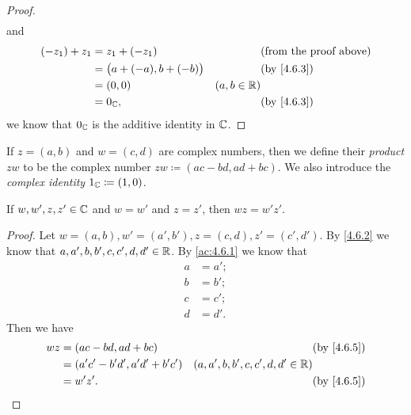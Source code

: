 \begin{proof}
\begin{align*}
  \end{align*}
  and
  \begin{align*}
    (-z_1) + z_1 & = z_1 + (-z_1)                 &               & \text{(from the proof above)} \\
                 & = \big(a + (-a), b + (-b)\big) &               & \text{(by \cref{4.6.3})}      \\
                 & = (0, 0)                       & (a, b \in \R)                                 \\
                 & = 0_{\C},                      &               & \text{(by \cref{4.6.3})}
  \end{align*}
  we know that \(0_{\mathbb{C}}\) is the additive identity in \(\mathbb{C}\).
\end{proof}

\begin{defn}\label{4.6.5}
  If \(z = (a, b)\) and \(w = (c, d)\) are complex numbers, then we define their \emph{product} \(zw\) to be the complex number \(zw \coloneqq (ac - bd, ad + bc)\).
  We also introduce the \emph{complex identity} \(1_{\mathbb{C}} \coloneqq (1, 0)\).
\end{defn}

\begin{ac}\label{ac:4.6.3}
  If \(w, w', z, z' \in \mathbb{C}\) and \(w = w'\) and \(z = z'\), then \(wz = w'z'\).
\end{ac}

\begin{proof}
  Let \(w = (a, b), w' = (a', b'), z = (c, d), z' = (c', d')\).
  By \cref{4.6.2} we know that \(a, a', b, b', c, c', d, d' \in \mathbb{R}\).
  By \cref{ac:4.6.1} we know that
  \begin{align*}
    a & = a'; \\
    b & = b'; \\
    c & = c'; \\
    d & = d'.
  \end{align*}
  Then we have
  \begin{align*}
    wz & = (ac - bd, ad + bc)             &                                     & \text{(by \cref{4.6.5})} \\
       & = (a' c' - b' d', a' d' + b' c') & (a, a', b, b', c, c', d, d' \in \R)                            \\
       & = w' z'.                         &                                     & \text{(by \cref{4.6.5})}
  \end{align*}
\end{proof}

